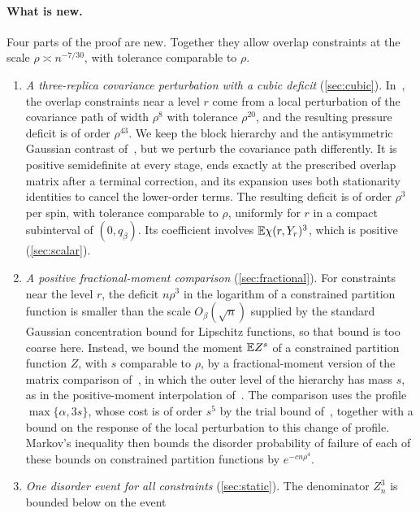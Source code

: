 \paragraph{What is new.}
Four parts of the proof are new. Together they allow overlap constraints at
the scale $\rho\asymp n^{-7/30}$, with tolerance comparable to $\rho$.
\begin{enumerate}
\item \emph{A three-replica covariance perturbation with a cubic deficit}
(\cref{sec:cubic}). In~\cite[Section~7]{oai-barriers}, the overlap
constraints near a level $r$ come from a local perturbation of the covariance
path of width $\rho^8$ with tolerance $\rho^{20}$, and the resulting pressure
deficit is of order $\rho^{43}$. We keep the block hierarchy and the
antisymmetric Gaussian contrast of~\cite[Section~7, Steps~1 and~2]{oai-barriers},
but we perturb the covariance path differently. It is positive
semidefinite at every stage, ends exactly at the prescribed overlap matrix
after a terminal correction, and its expansion uses both stationarity
identities to cancel the lower-order terms. The resulting
deficit is of order $\rho^3$ per spin, with tolerance comparable to $\rho$,
uniformly for $r$ in a compact subinterval of $(0,q_\beta)$. Its coefficient
involves $\mathbb E\chi(r,Y_r)^3$, which is positive (\cref{sec:scalar}).
\item \emph{A positive fractional-moment comparison} (\cref{sec:fractional}).
For constraints near the level $r$, the deficit $n\rho^3$ in the logarithm
of a constrained partition function is smaller than the scale $O_\beta(\sqrt n)$
supplied by the standard Gaussian concentration bound for Lipschitz
functions, so that bound is too coarse here. Instead, we bound the moment $\mathbb E Z^s$ of a constrained
partition function $Z$, with $s$ comparable to $\rho$, by a fractional-moment
version of the matrix comparison of~\cite[Proposition~2.3]{oai-barriers},
in which the outer level of the hierarchy has mass $s$, as in the
positive-moment interpolation of~\cite[Section~2]{quantitative-parisi}. The
comparison uses the profile $\max\{\alpha,3s\}$, whose cost is of order
$s^5$ by the trial bound of~\cite[Lemma~7.2]{quantitative-parisi}, together
with a bound on the response of the local perturbation to this change of
profile. Markov's inequality then bounds the disorder probability of
failure of each of these bounds on constrained partition functions by
$e^{-cn\rho^4}$.
\item \emph{One disorder event for all constraints} (\cref{sec:static}). The
denominator $Z_n^3$ is bounded below on the event

\end{enumerate}
